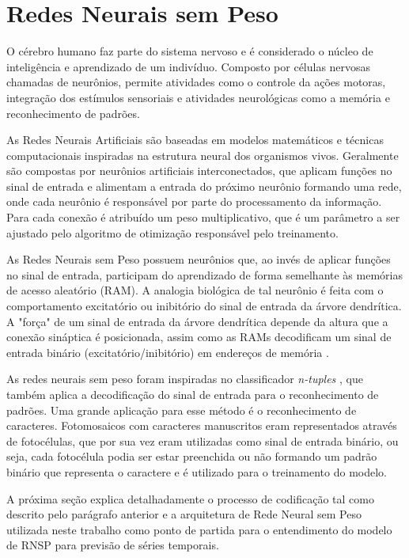 \chapter{Redes Neurais sem Peso}
    O cérebro humano faz parte do sistema nervoso e é considerado o núcleo de inteligência e aprendizado de um indivíduo. Composto por células nervosas chamadas de neurônios, permite atividades como o controle da ações motoras, integração dos estímulos sensoriais e atividades neurológicas como a memória e reconhecimento de padrões.
    
    As Redes Neurais Artificiais são baseadas em modelos matemáticos e técnicas computacionais inspiradas na estrutura neural dos organismos vivos. Geralmente são compostas por neurônios artificiais interconectados, que aplicam funções no sinal de entrada e alimentam a entrada do próximo neurônio formando uma rede, onde cada neurônio é responsável por parte do processamento da informação. Para cada conexão é atribuído um peso multiplicativo, que é um parâmetro a ser ajustado pelo algoritmo de otimização responsável pelo treinamento.
    
    As Redes Neurais sem Peso possuem neurônios que, ao invés de aplicar funções no sinal de entrada, participam do aprendizado de forma semelhante às memórias de acesso aleatório (RAM). A analogia biológica de tal neurônio é feita com o comportamento excitatório ou inibitório do sinal de entrada da árvore dendrítica. A "força" de um sinal de entrada da árvore dendrítica depende da altura que a conexão sináptica é posicionada, assim como as RAMs decodificam um sinal de entrada binário (excitatório/inibitório) em endereços de memória \cite{briefintrownn}.

    As redes neurais sem peso foram inspiradas no classificador \textit{n-tuples} \cite{bledsoe&browning}, que também aplica a decodificação do sinal de entrada para o reconhecimento de padrões. Uma grande aplicação para esse método é o reconhecimento de caracteres. Fotomosaicos com caracteres manuscritos eram representados através de fotocélulas, que por sua vez eram utilizadas como sinal de entrada binário, ou seja, cada fotocélula podia ser estar preenchida ou não formando um padrão binário que representa o caractere e é utilizado para o treinamento do modelo.
    
    A próxima seção explica detalhadamente o processo de codificação tal como descrito pelo parágrafo anterior e a arquitetura de Rede Neural sem Peso utilizada neste trabalho como ponto de partida para o entendimento do modelo de RNSP para previsão de séries temporais. 


